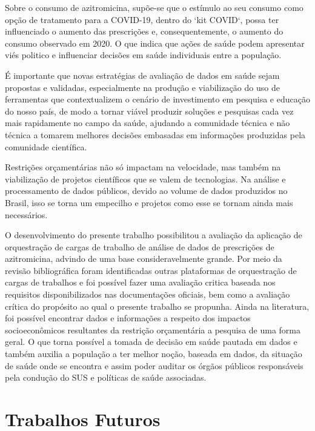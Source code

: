 Sobre o consumo de azitromicina, supõe-se que o estímulo ao seu consumo como opção de tratamento para a COVID-19, dentro do ‘kit COVID‘, possa ter influenciado o aumento das prescrições e, consequentemente, o aumento do consumo observado em 2020. O que indica que ações de saúde podem apresentar viés politico e influenciar decisões em saúde individuais entre a população. 

É importante que novas estratégias de avaliação de dados em saúde sejam propostas e validadas, especialmente na produção e viabilização do uso de ferramentas que contextualizem o cenário de investimento em pesquisa e educação do nosso país, de modo a tornar viável produzir soluções e pesquisas cada vez mais rapidamente no campo da saúde, ajudando a comunidade técnica e não técnica a tomarem melhores decisões embasadas em informações produzidas pela comunidade científica. 

Restrições orçamentárias não só impactam na velocidade, mas também na viabilização de projetos científicos que se valem de tecnologias. Na análise e processamento de dados públicos, devido ao volume de dados produzidos no Brasil, isso se torna um empecilho e projetos como esse se tornam ainda mais necessários.

O desenvolvimento do presente trabalho possibilitou a avaliação da aplicação de orquestração de cargas de trabalho de análise de dados de prescrições de azitromicina, advindo de uma base consideravelmente grande. Por meio da revisão bibliográfica foram identificadas outras plataformas de orquestração de cargas de trabalhos e foi possível fazer uma avaliação critica baseada nos requisitos disponibilizados nas documentações oficiais, bem como a avaliação crítica do propósito ao qual o presente trabalho se propunha. Ainda na literatura, foi possível encontrar dados e informações a respeito dos impactos socioeconômicos resultantes da restrição orçamentária a pesquisa de uma forma geral.  O que torna possível a tomada de decisão em saúde pautada em dados e também auxilia a população a ter melhor noção, baseada em dados, da situação de saúde onde se encontra e assim poder auditar os órgãos públicos responsáveis pela condução do SUS e políticas de saúde associadas.

\section{Trabalhos Futuros}
\label{sec:trabalhosFuturos}

